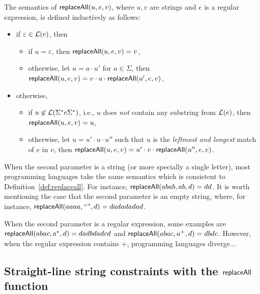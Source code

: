 \begin{definition} \label{def:replaceall}
The semantics of $\mathsf{replaceAll}(u, e, v)$, where $u, v$ are strings and $e$ is a regular expression, is defined inductively as follows:
\begin{itemize}
	\item if $\varepsilon \in \mathcal{L}(e)$, then
	\begin{itemize}
	\item if $u = \varepsilon$, then $\mathsf{replaceAll}(u,e, v) = v$,
	
	\item otherwise, let $u = a \cdot u'$ for $a \in \Sigma$, then $\mathsf{replaceAll}(u, e, v) =v \cdot a \cdot \mathsf{replaceAll}(u', e, v)$,
	\end{itemize}
%
	\item otherwise,
	\begin{itemize}
	\item if $u \not \in \mathcal{L}(\Sigma^\ast e \Sigma^\ast)$, i.e., $u$ does \emph{not} contain any substring from $\mathcal{L}(e)$, then $\mathsf{replaceAll}(u, e, v) = u$, 
	\item otherwise, let $u = u' \cdot u \cdot u''$ such that $u$ is the \emph{leftmost and longest} match of $e$ in $v$, then $\mathsf{replaceAll}(u, e, v) = u' \cdot v \cdot \mathsf{replaceAll}(u'', e, v)$.
	\end{itemize}
\end{itemize}
\end{definition}

\begin{example}
When the second parameter is a string (or more specially a single letter), most programming languages take the same semantics which is consistent to Definition~\ref{def:replaceall}. For instance,  $\mathsf{replaceAll}(abab, ab, d) =dd$. It is worth mentioning the case that the second parameter is an empty string, where, for instance,  $\mathsf{replaceAll}(aaaa, ``", d) =dadadadad$.

When the second parameter is a regular expression, some examples are $\mathsf{replaceAll}(abac, a^*, d) =d a d b d a d c d$ and $\mathsf{replaceAll}(abac, a^+, d)=dbdc$. However, when the regular expression contains $+$, programming languages diverge... 
\end{example}



\subsection{Straight-line string constraints with the $\mathsf{replaceAll}$ function}

